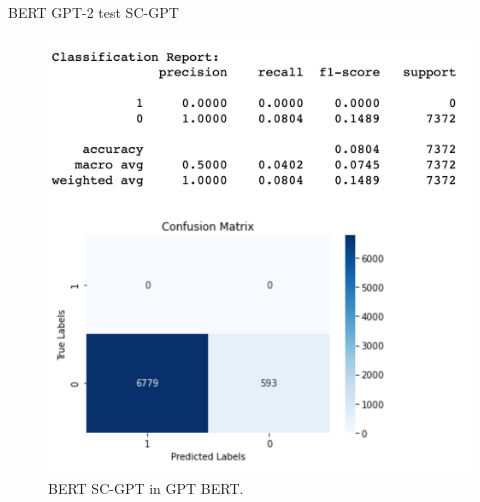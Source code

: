 \documentclass[11pt]{article}
\begin{document}
BERT GPT-2 test SC-GPT
\begin{figure}[H]
    \centering
       \includegraphics[scale=.6]{figures/SC-GPT in GPT BERT.png}
   \caption{BERT SC-GPT in GPT BERT.}
   \label{fig:5}
\end{figure}
\newpage
 

\newpage




\end{document}
